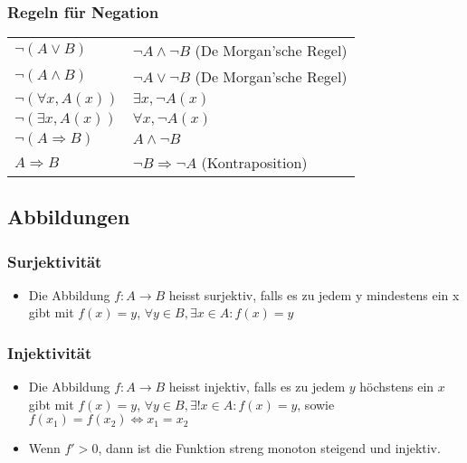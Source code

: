 \documentclass[a3paper, 11pt, landscape]{scrartcl}
\begin{document}
\begin{multicols*}{3}
\begin{tabular} {c l l}
			\end{tabular}\\
			
			\vspace{0.1cm}
		
		\subsubsection{Regeln für Negation}
		\vspace{0.1cm}
		\begin{tabular}{l l}
			$\neg (A \lor B)$ & $\neg A \land \neg B$ (De Morgan'sche Regel) \\
			$\neg (A \land B)$ & $\neg A \lor \neg B$ (De Morgan'sche Regel) \\
			$\neg (\forall x, A(x))$ & $\exists x, \neg A(x)$ \\
			$\neg (\exists x, A(x))$ & $\forall x , \neg A(x)$ \\
			$\neg (A \Rightarrow B) $ & $A \land \neg B$\\
			$A\Rightarrow B$ & $\neg B \Rightarrow \neg A$ (Kontraposition)
		\end{tabular}
	
	\subsection{Abbildungen}
	\subsubsection{Surjektivität}
	\begin{itemize}
	    \item Die Abbildung $f:A\to B$ heisst surjektiv, falls es zu jedem y mindestens ein x gibt mit $f(x) = y$, $\forall y \in B, \exists x \in A: f(x)=y$
	\end{itemize}
	
	\subsubsection{Injektivität}
	\begin{itemize}
	    \item Die Abbildung $f:A\to B$ heisst injektiv, falls es zu jedem $y$ höchstens ein $x$ gibt mit $f(x) = y$, $\forall y \in B, \exists! x \in A: f(x)=y$, sowie $f(x_1)=f(x_2)\iff x_1 = x_2$
	    \item Wenn $f'>0$, dann ist die Funktion streng monoton steigend und injektiv.
	\end{itemize}

\end{multicols*}
\end{document}
